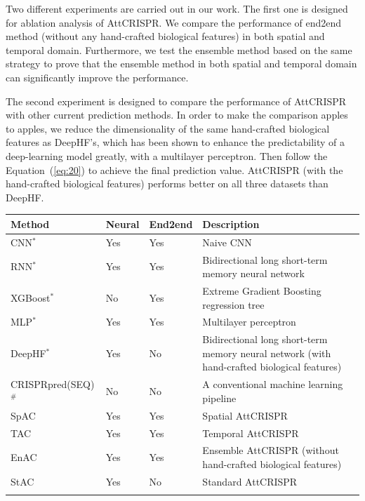 \documentclass{bioinfo}
\begin{document}
Two different experiments are carried out in our work. 
The first one is designed for ablation analysis of AttCRISPR. 
We compare the performance of end2end method (without any hand-crafted biological features) in both spatial and temporal domain. 
Furthermore, we test the ensemble method based on the same strategy to prove that the ensemble method in both spatial and temporal domain can significantly improve the performance. 

The second experiment is designed to compare the performance of AttCRISPR with other current prediction methods. 
In order to make the comparison apples to apples, we reduce the dimensionality of the same hand-crafted biological features as DeepHF's, 
which has been shown to enhance the predictability of a deep-learning model greatly, with a multilayer perceptron. 
Then follow the Equation~(\ref{eq:20}) to achieve the final prediction value. 
AttCRISPR (with the hand-crafted biological features) performs better on all three datasets than DeepHF. 

\begin{table}[!tpb]
    {\begin{tabular}{@{}lllp{3.5cm}l@{}}\toprule
        Method & Neural & End2end & Description\\\midrule
        CNN$^*$ & Yes & Yes & Naive CNN\\
        RNN$^*$ & Yes & Yes & Bidirectional long short-term memory neural network\\
        XGBoost$^*$ & No & Yes & Extreme Gradient Boosting regression tree\\
        MLP$^*$ & Yes & Yes & Multilayer perceptron\\
        DeepHF$^*$ & Yes & No & Bidirectional long short-term memory neural network (with hand-crafted biological features)\\
        CRISPRpred(SEQ)$^{\#}$ & No & No & A conventional machine learning pipeline\\
        SpAC & Yes & Yes & Spatial AttCRISPR\\
        TAC & Yes & Yes & Temporal AttCRISPR\\
        EnAC & Yes & Yes & Ensemble AttCRISPR (without hand-crafted biological features)\\
        StAC & Yes & No & Standard AttCRISPR\\
        \botrule
    \end{tabular}}\footnotesize{}
\end{table}
\end{document}
